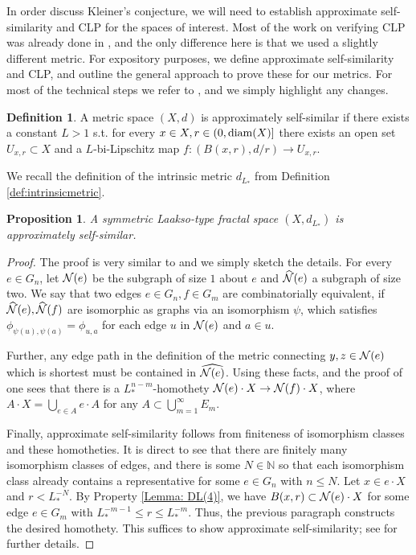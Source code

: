 \documentclass{amsart}
\newcommand{\diam}{{\rm diam}}
\newcommand{\cN}{{\rm \mathcal{N}}}
\newtheorem{proposition}[equation]{Proposition}
\numberwithin{equation}{section}
\theoremstyle{definition}
\newtheorem{definition}[equation]{Definition}
\theoremstyle{remark}
\newcommand{\N}{\mathbb{N}}
\begin{document}
In order discuss Kleiner's conjecture, we will need to establish approximate self-similarity and CLP for the spaces of interest. Most of the work on verifying CLP was already done in  \cite{anttila2024constructions}, and the only difference here is that we used a slightly different metric. For expository purposes, we define approximate self-similarity and CLP, and outline the general approach to prove these for our metrics. For most of the technical steps we refer to \cite{anttila2024constructions}, and we simply highlight any changes.

\begin{definition}\label{def:approxselfsim}
    A metric space $(X,d)$ is approximately self-similar if there exists a constant $L>1$ s.t. for every $x\in X, r\in (0,\diam(X)]$ there exists an open set $U_{x,r}\subset X$ and a $L$-bi-Lipschitz map $f:(B(x,r),d/r)\to U_{x,r}$. 
\end{definition}

We recall the definition of the intrinsic metric $d_{L_*}$ from Definition \ref{def:intrinsicmetric}.

\begin{proposition} A symmetric Laakso-type fractal space \((X,d_{L_*})\) is approximately self-similar.
\end{proposition}
\begin{proof}
    The proof is very similar to \cite[Section 3.8]{anttila2024constructions} and we simply sketch the details. For every $e\in G_n$, let $\cN(e)$ be the subgraph of size $1$ about $e$ and $\widehat{\cN}(e)$ a subgraph of size two. We say that two edges $e\in G_n, f\in G_m$ are combinatorially equivalent, if $\widehat{\cN}(e), \widehat{\cN}(f)$ are isomorphic as graphs via an isomorphism $\psi$, which satisfies $\phi_{\psi(u),\psi(a)}=\phi_{u,a}$ for each edge $u$ in $\cN(e)$ and $a\in u$. 

    Further, any edge path in the definition of the metric connecting $y,z\in \cN(e)$ which is shortest must be contained in $\widehat{\cN(e)}$. Using these facts, and the proof of \cite[Corollary 3.34]{anttila2024constructions} one sees that there is a $L_{*}^{n-m}$-homothety $\cN(e)\cdot X\to \cN(f)\cdot X$, where $A\cdot X = \bigcup_{e\in A} e\cdot A$ for any $A\subset \bigcup_{m=1}^\infty E_m$.

    Finally, approximate self-similarity follows from finiteness of isomorphism classes and these homotheties. 
    It is direct to see that there are finitely many isomorphism classes of edges, and there is some $N\in \N$ so that each isomorphism class already contains a representative for some $e\in G_n$ with $n\leq N$. Let $x\in e\cdot X$ and $r<L_*^{-N}$. By Property \ref{Lemma: DL(4)}, we have $B(x,r) \subset \cN(e)\cdot X$ for some edge $e\in G_m$ with $L_*^{-m-1}\leq r\leq L_*^{-m}$.  Thus, the previous paragraph constructs the desired homothety. This suffices to show approximate self-similarity; see \cite[Proposition 3.35.]{anttila2024constructions} for further details.
\end{proof}
\end{document}
